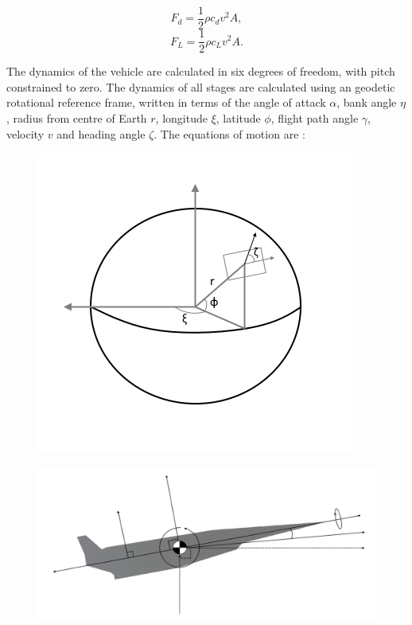 \begin{equation}
F_d = \frac{1}{2}\rho c_d v^2 A ,
\end{equation}
\begin{equation}
F_L = \frac{1}{2}\rho c_L v^2 A .
\end{equation}

The dynamics of the vehicle are calculated in six degrees of freedom, with pitch constrained to zero. 
The dynamics of all stages are calculated using an geodetic rotational reference frame, written in terms of the angle of attack $\alpha$, bank angle $\eta$, radius from centre of Earth $r$, longitude $\xi$, latitude $\phi$, flight path angle $\gamma$, velocity $v$ and heading angle $\zeta$. The equations of motion are \cite{Josselyn2002a}:
\begin{figure}
\centering
\includegraphics[width=0.7\linewidth]{figures/4_LODESTAR/global}
\caption{}
\label{fig:global}
\end{figure}
\begin{figure}
\centering
\includegraphics[width=0.9\linewidth]{figures/4_LODESTAR/Axes}
\caption{}
\label{fig:Axes}
\end{figure}


